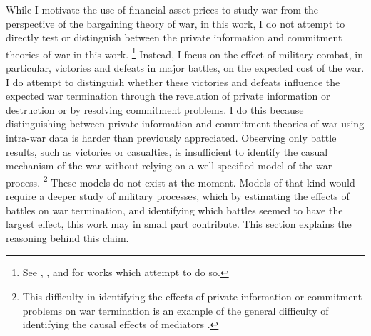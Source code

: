While I motivate the use of financial asset prices to study war from the perspective of the bargaining theory of war, in this work, I do not attempt to directly test or distinguish between the private information and commitment theories of war in this work.%
\footnote{See \textcite{Ramsay2008}, \textcite{Weisiger2015}, and \textcite{Reiter2009} for works which attempt to do so.}
Instead, I focus on the effect of military combat, in particular, victories and defeats in major battles, on the expected cost of the war.
I do attempt to distinguish whether these victories and defeats influence the expected war termination through the revelation of private information or destruction or by resolving commitment problems.
I do this because distinguishing between private information and commitment theories of war using intra-war data is harder than previously appreciated.
Observing only battle results, such as victories or casualties, is insufficient to identify the casual mechanism of the war without relying on a well-specified model of the war process.%
\footnote{This difficulty in identifying the effects of private information or commitment problems on war termination is an example of the general difficulty of identifying the causal effects of mediators \parencite{Keele2015a}.}
These models do not exist at the moment.
Models of that kind would require a deeper study of military processes, which by estimating the effects of battles on war termination, and identifying which battles seemed to have the largest effect, this work may in small part contribute.
This section explains the reasoning behind this claim.


